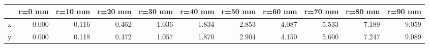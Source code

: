 \documentclass[convert={convertexe={magick.exe}}]{standalone}
\begin{document}
\begin{tabular}{lrrrrrrrrrr}
\toprule
{} &  r=0 mm &  r=10 mm &  r=20 mm &  r=30 mm &  r=40 mm &  r=50 mm &  r=60 mm &  r=70 mm &  r=80 mm &  r=90 mm \\
\midrule
x &   0.000 &    0.116 &    0.462 &    1.036 &    1.834 &    2.853 &    4.087 &    5.533 &    7.189 &    9.059 \\
y &   0.000 &    0.118 &    0.472 &    1.057 &    1.870 &    2.904 &    4.150 &    5.600 &    7.247 &    9.089 \\
\bottomrule
\end{tabular}
\end{document}
